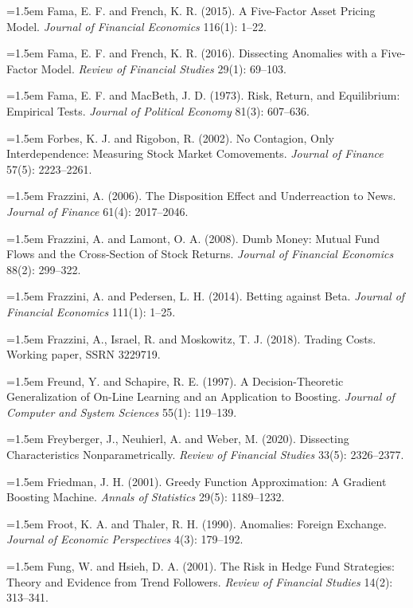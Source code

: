 \hangindent=1.5em Fama, E. F. and French, K. R. (2015). A Five-Factor Asset Pricing Model. \emph{Journal of Financial Economics} 116(1): 1--22.

\hangindent=1.5em Fama, E. F. and French, K. R. (2016). Dissecting Anomalies with a Five-Factor Model. \emph{Review of Financial Studies} 29(1): 69--103.

\hangindent=1.5em Fama, E. F. and MacBeth, J. D. (1973). Risk, Return, and Equilibrium: Empirical Tests. \emph{Journal of Political Economy} 81(3): 607--636.

\hangindent=1.5em Forbes, K. J. and Rigobon, R. (2002). No Contagion, Only Interdependence: Measuring Stock Market Comovements. \emph{Journal of Finance} 57(5): 2223--2261.

\hangindent=1.5em Frazzini, A. (2006). The Disposition Effect and Underreaction to News. \emph{Journal of Finance} 61(4): 2017--2046.

\hangindent=1.5em Frazzini, A. and Lamont, O. A. (2008). Dumb Money: Mutual Fund Flows and the Cross-Section of Stock Returns. \emph{Journal of Financial Economics} 88(2): 299--322.

\hangindent=1.5em Frazzini, A. and Pedersen, L. H. (2014). Betting against Beta. \emph{Journal of Financial Economics} 111(1): 1--25.

\hangindent=1.5em Frazzini, A., Israel, R. and Moskowitz, T. J. (2018). Trading Costs. Working paper, SSRN 3229719.

\hangindent=1.5em Freund, Y. and Schapire, R. E. (1997). A Decision-Theoretic Generalization of On-Line Learning and an Application to Boosting. \emph{Journal of Computer and System Sciences} 55(1): 119--139.

\hangindent=1.5em Freyberger, J., Neuhierl, A. and Weber, M. (2020). Dissecting Characteristics Nonparametrically. \emph{Review of Financial Studies} 33(5): 2326--2377.

\hangindent=1.5em Friedman, J. H. (2001). Greedy Function Approximation: A Gradient Boosting Machine. \emph{Annals of Statistics} 29(5): 1189--1232.

\hangindent=1.5em Froot, K. A. and Thaler, R. H. (1990). Anomalies: Foreign Exchange. \emph{Journal of Economic Perspectives} 4(3): 179--192.

\hangindent=1.5em Fung, W. and Hsieh, D. A. (2001). The Risk in Hedge Fund Strategies: Theory and Evidence from Trend Followers. \emph{Review of Financial Studies} 14(2): 313--341.

